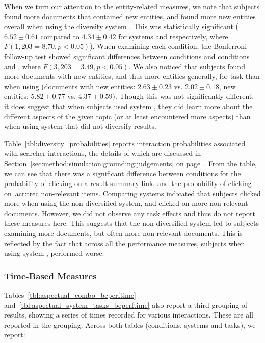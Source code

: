 When we turn our attention to the entity-related measures, we note that subjects found more documents that contained new entities, and found more new entities overall when using the diversity system . This was statistically significant ($6.52\pm0.61$ compared to $4.34\pm0.42$ for systems  and  respectively, where $F(1,203 = 8.70, p<0.05)$). When examining each condition, the Bonferroni follow-up test showed significant differences between conditions  and conditions  and , where $F(3,203 = 3.49, p < 0.05)$. We also noticed that subjects found more documents with new entities, and thus more entities generally, for task  than when using  (documents with new entities: $2.63\pm0.23$ vs. $2.02\pm0.18$, new entities: $5.82\pm0.77$ vs. $4.37\pm0.59$). Though this was not significantly different, it does suggest that when subjects used system , they did learn more about the different aspects of the given topic (or at least encountered more aspects) than when using system  that did not diversify results.

Table~\ref{tbl:diversity_probabilities} reports interaction probabilities associated with searcher interactions, the details of which are discussed in Section~\ref{sec:method:simulation:grounding:judgements} on page~\pageref{sec:method:simulation:grounding:judgements}. From the table, we can see that there was a significant difference between conditions for the probability of clicking on a result summary link, and the probability of clicking on~\gls{acr:trec} non-relevant items. Comparing systems indicated that subjects clicked more when using the non-diversified system, and clicked on more non-relevant documents. However, we did not observe any task effects and thus do not report these measures here. This suggests that the non-diversified system  led to subjects examining more documents, but often more non-relevant documents. This is reflected by the fact that across all the performance measures, subjects when using system , performed worse.

\subsubsection{Time-Based Measures}
Tables~\ref{tbl:aspectual_combo_beperftime} and~\ref{tbl:aspectual_system_tasks_beperftime} also report a third grouping of results, showing a series of times recorded for various interactions. These are all reported in the  grouping. Across both tables (conditions, systems and tasks), we report:

